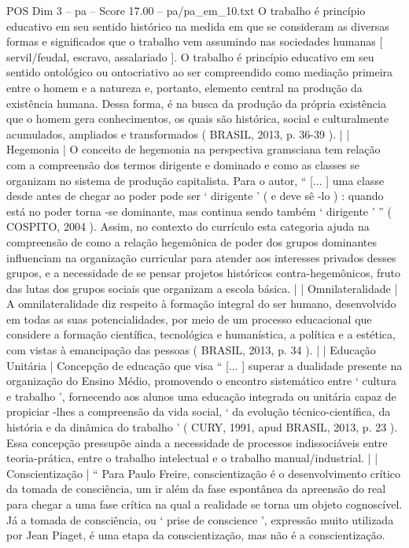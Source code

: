 \begin{textsample}{POS Dim 3 – pa – Score 17.00 – pa/pa\_em\_10.txt}
O trabalho é princípio educativo em seu sentido histórico na medida em que se consideram as diversas formas e significados que o trabalho vem assumindo nas sociedades humanas [ servil/feudal, escravo, assalariado ].
O trabalho é princípio educativo em seu sentido ontológico ou ontocriativo ao ser compreendido como mediação primeira entre o homem e a natureza e, portanto, elemento central na produção da existência humana.
Dessa forma, é na busca da produção da própria existência que o homem gera conhecimentos, os quais são histórica, social e culturalmente acumulados, ampliados e transformados ( BRASIL, 2013, p. 36-39 ). | | Hegemonia | O conceito de hegemonia na perspectiva gramsciana tem relação com a compreensão dos termos dirigente e dominado e como as classes se organizam no sistema de produção capitalista.
Para o autor, “ [... ] uma classe desde antes de chegar ao poder pode ser ‘ dirigente ’ ( e deve sê -lo ) : quando está no poder torna -se dominante, mas continua sendo também ‘ dirigente ’ ” ( COSPITO, 2004 ).
Assim, no contexto do currículo esta categoria ajuda na compreensão de como a relação hegemônica de poder dos grupos dominantes influenciam na organização curricular para atender aos interesses privados desses grupos, e a necessidade de se pensar projetos históricos contra-hegemônicos, fruto das lutas dos grupos sociais que organizam a escola básica. | | Omnilateralidade | A omnilateralidade diz respeito à formação integral do ser humano, desenvolvido em todas as suas potencialidades, por meio de um processo educacional que considere a formação científica, tecnológica e humanística, a política e a estética, com vistas à emancipação das pessoas ( BRASIL, 2013, p. 34 ). | | Educação Unitária | Concepção de educação que visa “ [... ] superar a dualidade presente na organização do Ensino Médio, promovendo o encontro sistemático entre ‘ cultura e trabalho ’, fornecendo aos alunos uma educação integrada ou unitária capaz de propiciar -lhes a compreensão da vida social, ‘ da evolução técnico-científica, da história e da dinâmica do trabalho ’ ( CURY, 1991, apud BRASIL, 2013, p. 23 ).
Essa concepção pressupõe ainda a necessidade de processos indissociáveis entre teoria-prática, entre o trabalho intelectual e o trabalho manual/industrial. | | Conscientização | “ Para Paulo Freire, conscientização é o desenvolvimento crítico da tomada de consciência, um ir além da fase espontânea da apreensão do real para chegar a uma fase crítica na qual a realidade se torna um objeto cognoscível.
Já a tomada de consciência, ou ‘ prise de conscience ’, expressão muito utilizada por Jean Piaget, é uma etapa da conscientização, mas não é a conscientização.

\end{textsample}
